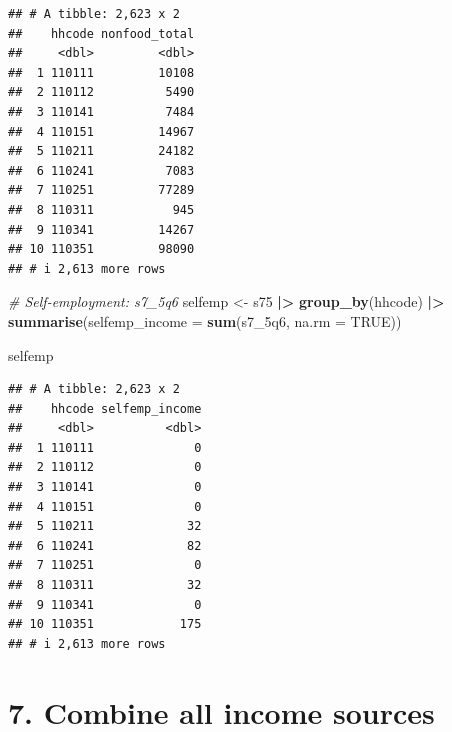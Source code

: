 \documentclass[
]{article}
\newenvironment{Shaded}{\begin{snugshade}}{\end{snugshade}}
\newcommand{\AttributeTok}[1]{\textcolor[rgb]{0.13,0.29,0.53}{#1}}
\newcommand{\CommentTok}[1]{\textcolor[rgb]{0.56,0.35,0.01}{\textit{#1}}}
\newcommand{\ConstantTok}[1]{\textcolor[rgb]{0.56,0.35,0.01}{#1}}
\newcommand{\FunctionTok}[1]{\textcolor[rgb]{0.13,0.29,0.53}{\textbf{#1}}}
\newcommand{\NormalTok}[1]{#1}
\newcommand{\OtherTok}[1]{\textcolor[rgb]{0.56,0.35,0.01}{#1}}
\newcommand{\SpecialCharTok}[1]{\textcolor[rgb]{0.81,0.36,0.00}{\textbf{#1}}}
\begin{document}
\begin{verbatim}
## # A tibble: 2,623 x 2
##    hhcode nonfood_total
##     <dbl>         <dbl>
##  1 110111         10108
##  2 110112          5490
##  3 110141          7484
##  4 110151         14967
##  5 110211         24182
##  6 110241          7083
##  7 110251         77289
##  8 110311           945
##  9 110341         14267
## 10 110351         98090
## # i 2,613 more rows
\end{verbatim}

\begin{Shaded}
\begin{Highlighting}[]
\CommentTok{\# Self{-}employment: s7\_5q6}
\NormalTok{selfemp }\OtherTok{\textless{}{-}}\NormalTok{ s75 }\SpecialCharTok{|\textgreater{}}
  \FunctionTok{group\_by}\NormalTok{(hhcode) }\SpecialCharTok{|\textgreater{}}
  \FunctionTok{summarise}\NormalTok{(}\AttributeTok{selfemp\_income =} \FunctionTok{sum}\NormalTok{(s7\_5q6, }\AttributeTok{na.rm =} \ConstantTok{TRUE}\NormalTok{))}

\NormalTok{selfemp}
\end{Highlighting}
\end{Shaded}

\begin{verbatim}
## # A tibble: 2,623 x 2
##    hhcode selfemp_income
##     <dbl>          <dbl>
##  1 110111              0
##  2 110112              0
##  3 110141              0
##  4 110151              0
##  5 110211             32
##  6 110241             82
##  7 110251              0
##  8 110311             32
##  9 110341              0
## 10 110351            175
## # i 2,613 more rows
\end{verbatim}

\section{7. Combine all income
sources}\label{combine-all-income-sources}
\end{document}
